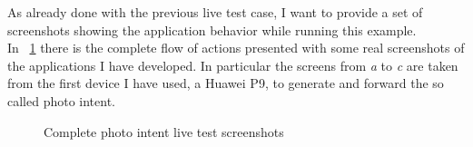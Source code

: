 As already done with the previous live test case, I want to provide a set of screenshots showing the application behavior while running this example.\\
In \figurename~\ref{fig:5.9} there is the complete flow of actions presented with some real screenshots of the applications I have developed. In particular the screens from \textit{a} to \textit{c} are taken from the first device I have used, a Huawei P9, to generate and forward the so called photo intent.\\
\begin{figure}[h!]
	\centering
	\begin{minipage}{.24\textwidth}\centering
	\end{minipage}
	\begin{minipage}{.24\textwidth}\centering
	\end{minipage}
	\centering
	\begin{minipage}{.24\textwidth}\centering
	\end{minipage}
	\begin{minipage}{.24\textwidth}\centering
	\end{minipage}
	\label{fig:5.9}
\end{figure}
\begin{figure}[h!]
	\ContinuedFloat
	\centering
	\begin{minipage}{.24\textwidth}\centering
		\bigskip
	\end{minipage}
	\begin{minipage}{.24\textwidth}\centering
		\bigskip
	\end{minipage}
	\begin{minipage}{.24\textwidth}\centering
		\bigskip
	\end{minipage}
	\begin{minipage}{.24\textwidth}\centering
		\bigskip
	\end{minipage}
	\caption{Complete photo intent live test screenshots}
	
\end{figure}\\
